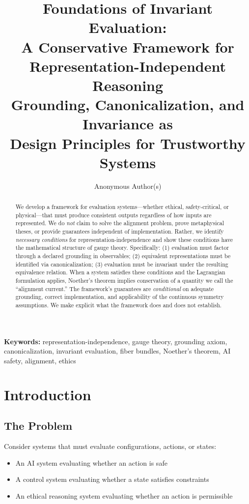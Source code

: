 \documentclass[12pt]{article}
\title{\textbf{Foundations of Invariant Evaluation:\\
A Conservative Framework for\\
Representation-Independent Reasoning}\\[10pt]
\large Grounding, Canonicalization, and Invariance as\\
Design Principles for Trustworthy Systems}
\author{Anonymous Author(s)}
\date{}
\theoremstyle{definition}
\theoremstyle{remark}
\begin{document}
\maketitle

\noindent\textbf{Keywords:} representation-independence, gauge theory, grounding axiom, canonicalization, invariant evaluation, fiber bundles, Noether's theorem, AI safety, alignment, ethics

\begin{abstract}
We develop a framework for evaluation systems---whether ethical, safety-critical, or
physical---that must produce consistent outputs regardless of how inputs are represented.
We do \emph{not} claim to solve the alignment problem, prove metaphysical theses, or provide
guarantees independent of implementation. Rather, we identify \emph{necessary conditions} for
representation-independence and show these conditions have the mathematical structure
of gauge theory. Specifically: (1) evaluation must factor through a declared grounding in
observables; (2) equivalent representations must be identified via canonicalization; (3) evaluation must be invariant under the resulting equivalence relation. When a system satisfies
these conditions and the Lagrangian formulation applies, Noether's theorem implies conservation of a quantity we call the ``alignment current.'' The framework's guarantees are
\emph{conditional} on adequate grounding, correct implementation, and applicability of the continuous symmetry assumptions. We make explicit what the framework does and does not
establish.
\end{abstract}

\tableofcontents

\newpage

\section{Introduction}

\subsection{The Problem}

Consider systems that must evaluate configurations, actions, or states:

\begin{itemize}
    \item An AI system evaluating whether an action is safe
    \item A control system evaluating whether a state satisfies constraints
    \item An ethical reasoning system evaluating whether an action is permissible
\end{itemize}
\end{document}
